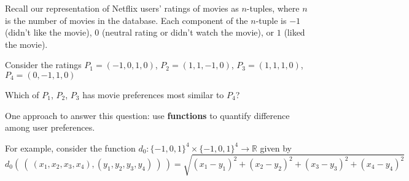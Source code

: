 
Recall our representation of Netflix users' ratings of movies as $n$-tuples, where
$n$ is the number of movies in the database. 
Each component of the $n$-tuple is $-1$ (didn't like the movie), $0$ 
(neutral rating or didn't watch the movie), or $1$ (liked the movie).

Consider the ratings $P_1 = (-1, 0, 1, 0)$, $P_2 = (1, 1, -1, 0)$, $P_3 = (1, 1, 1, 0)$,
$P_4 = (0,-1,1, 0)$


Which of $P_1$, $P_2$, $P_3$ has movie preferences most similar to $P_4$?

One approach to answer this question: use {\bf functions} to quantify difference among user preferences.

For example, consider the function 
$d_0: \{-1,0,1\}^4 \times \{-1,0,1\}^4 \to \mathbb{R}$
given by
\[
d_0 (~(~ (x_1, x_2, x_3, x_4), (y_1, y_2, y_3, y_4) ~) ~) = \sqrt{ (x_1 - y_1)^2 + (x_2 - y_2)^2 + (x_3 -y_3)^2 + (x_4 -y_4)^2}
\]


\vfill
\vfill

\begin{comment}
    

{\it Extra example:} A new movie is released, and $P_1$ and $P_2$ watch it before $P_3$, and give it
ratings; $P_1$ gives \cmark~and $P_2$ gives \xmark.
Should this movie be recommended to $P_3$? Why or why not?

{\it Extra example:} Define a new function that could be used to compare the $4$-tuples of ratings encoding
movie preferences now that there are four movies in the database.

\vfill
\end{comment}
\newpage